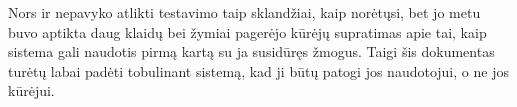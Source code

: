 Nors ir nepavyko atlikti testavimo taip sklandžiai, kaip norėtųsi,
bet jo metu buvo aptikta daug klaidų bei žymiai pagerėjo kūrėjų
supratimas apie tai, kaip sistema gali naudotis pirmą kartą su ja
susidūręs žmogus. Taigi šis dokumentas turėtų labai padėti tobulinant
sistemą, kad ji būtų patogi jos naudotojui, o ne jos kūrėjui.
